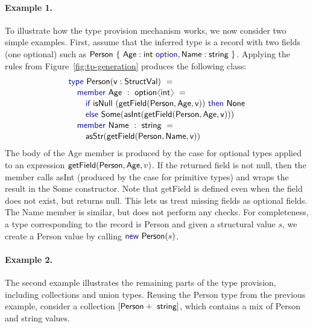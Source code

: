 \documentclass[10pt,preprint,clearpagebib]{sigplanconf}
\newcommand{\langl}{\begin{picture}(4.5,7)
\put(1.1,2.5){\rotatebox{60}{\line(1,0){5.5}}}
\put(1.1,2.5){\rotatebox{300}{\line(1,0){5.5}}}
\end{picture}}
\newcommand{\rangl}{\begin{picture}(4.5,7)
\put(.9,2.5){\rotatebox{120}{\line(1,0){5.5}}}
\put(.9,2.5){\rotatebox{240}{\line(1,0){5.5}}}
\end{picture}}
\newcommand{\kvd}[1]{\textnormal{\textcolor{kvdclr}{\sffamily #1}}}
\newcommand{\ident}[1]{\textnormal{\sffamily #1}}
\begin{document}
\paragraph{Example 1.}
To illustrate how the type provision mechanism works, we now consider two simple examples. First, assume 
that the inferred type is a record with two fields (one optional) such as 
$\ident{Person}~\{~\ident{Age}:\ident{int}~\kvd{option}, \ident{Name}:\ident{string}~ \}$. Applying the
rules from Figure~\ref{fig:tp-generation} produces the following class:
%
\begin{equation*}
\begin{array}{l}
 \kvd{type}~\ident{Person}(\ident{v}:\ident{StructVal})~= \\[0.1em]
 \quad \kvd{member}~\ident{Age}~:~\ident{option}\langl\ident{int}\rangl~= \\[0.1em]
 \qquad \kvd{if}~\ident{isNull}~(\ident{getField}(\ident{Person},\ident{Age}, \ident{v}))~\kvd{then}~\ident{None} \\[0.1em]
 \qquad \kvd{else}~\ident{Some}(\ident{asInt}(\ident{getField}(\ident{Person},\ident{Age}, \ident{v}))) \\[0.1em]
 \quad \kvd{member}~\ident{Name}~:~\ident{string}~= \\[0.1em]
 \qquad \ident{asStr}(\ident{getField}(\ident{Person},\ident{Name}, \ident{v}))
\end{array}
\end{equation*}
%
The body of the \ident{Age} member is produced by the case for optional types applied to an expression
$\ident{getField}(\ident{Person},\ident{Age},v)$. If the returned field is not \kvd{null}, then the member
calls \ident{asInt} (produced by the case for primitive types) and wraps the result in the \ident{Some}
constructor. Note that \ident{getField} is defined even when the field does not exist, but returns \ident{null}.
This lets us treat missing fields as optional fields. The \ident{Name} member is similar, but does not 
perform any checks. 
For completeness, a type corresponding to the record is \ident{Person} and given a 
structural value $s$, we create a \ident{Person} value by calling $\kvd{new}~\ident{Person}(s)$.

\paragraph{Example 2.} The second example illustrates the remaining parts of the type provision,
including collections and union types. Reusing the \ident{Person} type from the previous example,
consider a collection $[\ident{Person}+\ident{string}]$, which contains a mix of \ident{Person} and string values.
\end{document}
